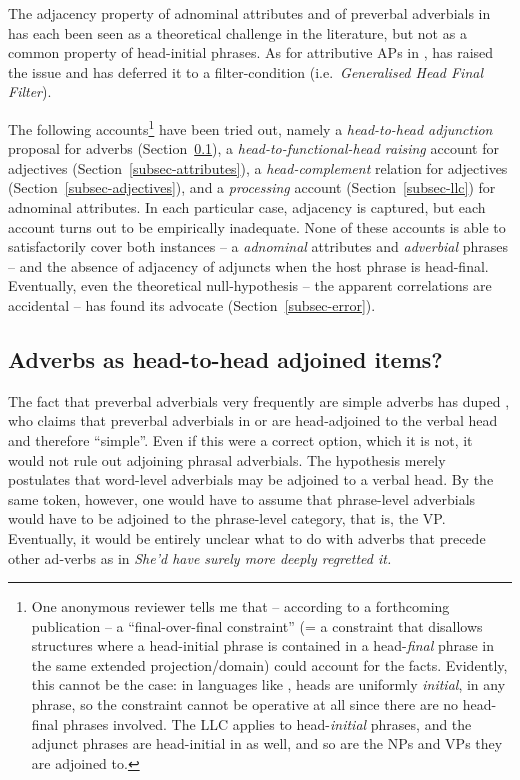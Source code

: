 \documentclass[output=paper
  ,nobabel
  ,uniformtopskip %
]{langscibook}
\begin{document}
The adjacency property of adnominal attributes and of preverbal adverbials in  has each been seen as a theoretical challenge in the literature, but not as a common property of head-initial phrases. As for attributive APs in , \citet{Emonds76a-u} has raised the issue and \citet{Williams1982} has deferred it to a filter-condition (i.e.\ \emph{Generalised Head Final Filter}).

The following accounts\footnote{One anonymous reviewer tells me that – according to a forthcoming
  publication – a ``final-over-final constraint'' (= a constraint that disallows structures where a
  head-initial phrase is contained in a head-\emph{final} phrase in the same extended
  projection/domain) could account for the facts. Evidently, this cannot be the case: in languages
  like , heads are uniformly \emph{initial}, in any phrase, so the constraint cannot be
  operative at all since there are no head-final phrases involved. The LLC applies to
  head-\emph{initial} phrases, and the adjunct phrases are head-initial in  as well, and so
  are the NPs and VPs they are adjoined to.} have been tried out, namely a \emph{head-to-head
  adjunction} proposal for adverbs (Section~\ref{subsec-adverbs}), a \emph{head-to-functional-head
  raising} account for adjectives (Section~\ref{subsec-attributes}), a \emph{head-complement}
relation for adjectives (Section~\ref{subsec-adjectives}), and a \emph{processing} account (Section~\ref{subsec-llc}) for
adnominal attributes. In each particular case, adjacency is captured, but each account turns out to
be empirically inadequate. None of these accounts is able to satisfactorily cover both instances –
a \emph{adnominal} attributes and \emph{adverbial} phrases – and the absence of adjacency of adjuncts when the host phrase is head-final. Eventually, even the theoretical null-hypothesis – the apparent correlations are accidental – has found its advocate (Section~\ref{subsec-error}).

\subsection{Adverbs as head-to-head adjoined items?}\label{subsec-adverbs}

The fact that preverbal adverbials very frequently are simple adverbs has duped \citet[409]{Bouchard1995}, who claims that preverbal adverbials in  or  are head-adjoined to the verbal head and therefore ``simple''. Even if this were a correct option, which it is not, it would not rule out adjoining phrasal adverbials. The hypothesis merely postulates that word-level adverbials may be adjoined to a verbal head. By the same token, however, one would have to assume that phrase-level adverbials would have to be adjoined to the phrase-level category, that is, the VP. Eventually, it would be entirely unclear what to do with adverbs that precede other ad-verbs as in \emph{She'd have surely more deeply regretted it.}
\end{document}
